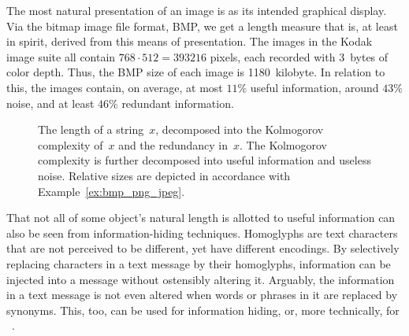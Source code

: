 \begin{example}[continued]
\label{ex:bmp_png_jpeg}%
  The most natural presentation of an image is as its intended graphical display.
  Via the bitmap image file format, BMP, we get a length measure that is, at least in spirit, derived from this means of presentation.
  The images in the Kodak image suite all contain $768 \cdot 512 = 393216$ pixels, each recorded with $3$~bytes of color depth.
  Thus, the BMP size of each image is 1180~kilobyte.
  In relation to this, the images contain, on average, at most $11\%$ useful information, around $43\%$ noise, and at least $46\%$ redundant information.
\end{example}

\begin{figure}
  \centering
  \caption{
    The length of a string~$x$, decomposed into the Kolmogorov complexity of~$x$ and the redundancy in~$x$.
    The Kolmogorov complexity is further decomposed into useful information and useless noise.
    Relative sizes are depicted in accordance with Example~\ref{ex:bmp_png_jpeg}.
  }
  \label{fig:length_decomposed}
\end{figure}

That not all of some object's natural length is allotted to useful information can also be seen from information-hiding techniques.
Homoglyphs are text characters that are not perceived to be different, yet have different encodings.
By selectively replacing characters in a text message by their homoglyphs, information can be injected into a message without ostensibly altering it.
Arguably, the information in a text message is not even altered when words or phrases in it are replaced by synonyms.
This, too, can be used for information hiding, or, more technically, for ~\parencite{hosmani2015dual}.

